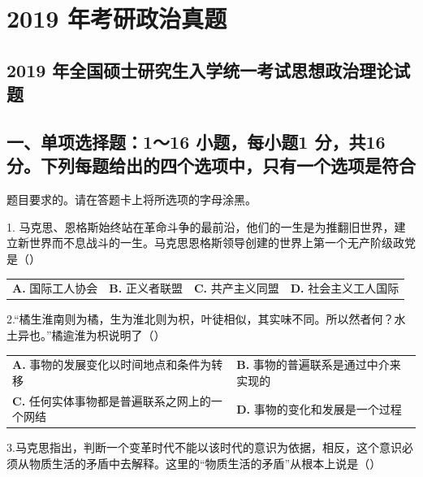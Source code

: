 \documentclass[UTF8,11pt]{ctexart}
\begin{document}
\section*{2019 年考研政治真题}
\subsection*{2019 年全国硕士研究生入学统一考试思想政治理论试题}

\subsection*{一、单项选择题：1～16 小题，每小题1 分，共16 分。下列每题给出的四个选项中，只有一个选项是符合}

题目要求的。请在答题卡上将所选项的字母涂黑。


1. 马克思、恩格斯始终站在革命斗争的最前沿，他们的一生是为推翻旧世界，建立新世界而不息战斗的一生。马克思恩格斯领导创建的世界上第一个无产阶级政党是（）


\begin{center}\begin{tabular}{>{\raggedright\arraybackslash}p{\dimexpr(\linewidth-8\tabcolsep)/4\relax}>{\raggedright\arraybackslash}p{\dimexpr(\linewidth-8\tabcolsep)/4\relax}>{\raggedright\arraybackslash}p{\dimexpr(\linewidth-8\tabcolsep)/4\relax}>{\raggedright\arraybackslash}p{\dimexpr(\linewidth-8\tabcolsep)/4\relax}}
\textbf{A.} 国际工人协会 & \textbf{B.} 正义者联盟 & \textbf{C.} 共产主义同盟 & \textbf{D.} 社会主义工人国际\\[.35em]\end{tabular}\end{center}

2.“橘生淮南则为橘，生为淮北则为枳，叶徒相似，其实味不同。所以然者何？水土异也。”橘逾淮为枳说明了（）


\begin{center}\begin{tabular}{>{\raggedright\arraybackslash}p{\dimexpr(\linewidth-4\tabcolsep)/2\relax}>{\raggedright\arraybackslash}p{\dimexpr(\linewidth-4\tabcolsep)/2\relax}}
\textbf{A.} 事物的发展变化以时间地点和条件为转移 & \textbf{B.} 事物的普遍联系是通过中介来实现的\\[.35em]
\textbf{C.} 任何实体事物都是普遍联系之网上的一个网结 & \textbf{D.} 事物的变化和发展是一个过程\\[.35em]\end{tabular}\end{center}

3.马克思指出，判断一个变革时代不能以该时代的意识为依据，相反，这个意识必须从物质生活的矛盾中去解释。这里的“物质生活的矛盾”从根本上说是（）
\end{document}
